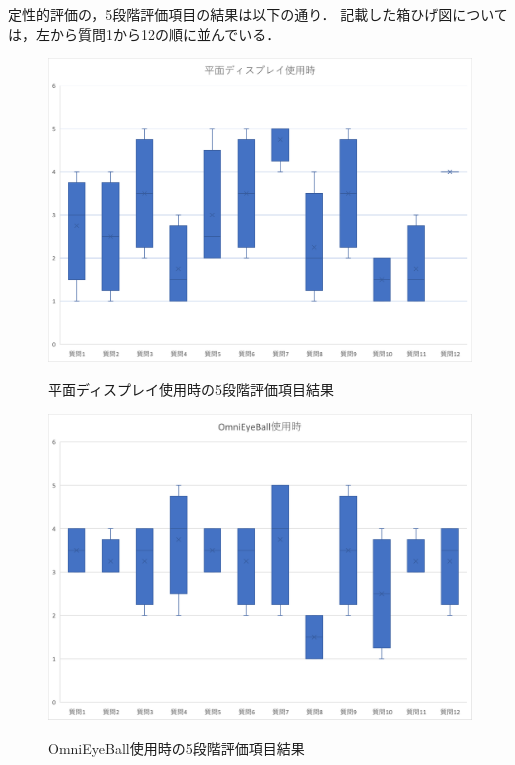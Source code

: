 定性的評価の，5段階評価項目の結果は以下の通り．
記載した箱ひげ図については，左から質問1から12の順に並んでいる．
\begin{figure}[tp]
  \centering
  \includegraphics[scale=0.8]{fig/boxplot11.png}\label{boxplot1}
  \caption{平面ディスプレイ使用時の5段階評価項目結果}
  \includegraphics[scale=0.8]{fig/boxplot10.png}\label{boxplot2}
  \caption{OmniEyeBall使用時の5段階評価項目結果}
\end{figure}



